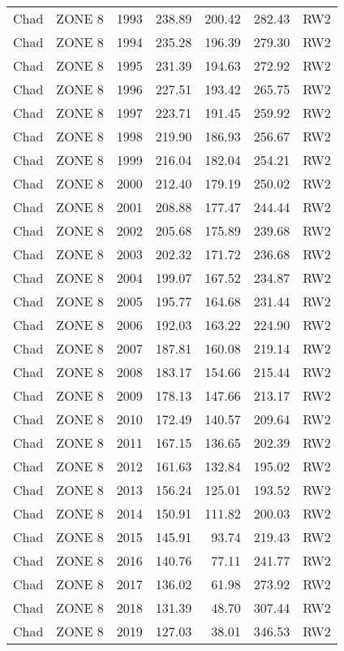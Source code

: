 \begin{longtable}{lllrrrl}
  Chad & ZONE 8 & 1993 & 238.89 & 200.42 & 282.43 & RW2 \\ 
  Chad & ZONE 8 & 1994 & 235.28 & 196.39 & 279.30 & RW2 \\ 
  Chad & ZONE 8 & 1995 & 231.39 & 194.63 & 272.92 & RW2 \\ 
  Chad & ZONE 8 & 1996 & 227.51 & 193.42 & 265.75 & RW2 \\ 
  Chad & ZONE 8 & 1997 & 223.71 & 191.45 & 259.92 & RW2 \\ 
  Chad & ZONE 8 & 1998 & 219.90 & 186.93 & 256.67 & RW2 \\ 
  Chad & ZONE 8 & 1999 & 216.04 & 182.04 & 254.21 & RW2 \\ 
  Chad & ZONE 8 & 2000 & 212.40 & 179.19 & 250.02 & RW2 \\ 
  Chad & ZONE 8 & 2001 & 208.88 & 177.47 & 244.44 & RW2 \\ 
  Chad & ZONE 8 & 2002 & 205.68 & 175.89 & 239.68 & RW2 \\ 
  Chad & ZONE 8 & 2003 & 202.32 & 171.72 & 236.68 & RW2 \\ 
  Chad & ZONE 8 & 2004 & 199.07 & 167.52 & 234.87 & RW2 \\ 
  Chad & ZONE 8 & 2005 & 195.77 & 164.68 & 231.44 & RW2 \\ 
  Chad & ZONE 8 & 2006 & 192.03 & 163.22 & 224.90 & RW2 \\ 
  Chad & ZONE 8 & 2007 & 187.81 & 160.08 & 219.14 & RW2 \\ 
  Chad & ZONE 8 & 2008 & 183.17 & 154.66 & 215.44 & RW2 \\ 
  Chad & ZONE 8 & 2009 & 178.13 & 147.66 & 213.17 & RW2 \\ 
  Chad & ZONE 8 & 2010 & 172.49 & 140.57 & 209.64 & RW2 \\ 
  Chad & ZONE 8 & 2011 & 167.15 & 136.65 & 202.39 & RW2 \\ 
  Chad & ZONE 8 & 2012 & 161.63 & 132.84 & 195.02 & RW2 \\ 
  Chad & ZONE 8 & 2013 & 156.24 & 125.01 & 193.52 & RW2 \\ 
  Chad & ZONE 8 & 2014 & 150.91 & 111.82 & 200.03 & RW2 \\ 
  Chad & ZONE 8 & 2015 & 145.91 & 93.74 & 219.43 & RW2 \\ 
  Chad & ZONE 8 & 2016 & 140.76 & 77.11 & 241.77 & RW2 \\ 
  Chad & ZONE 8 & 2017 & 136.02 & 61.98 & 273.92 & RW2 \\ 
  Chad & ZONE 8 & 2018 & 131.39 & 48.70 & 307.44 & RW2 \\ 
  Chad & ZONE 8 & 2019 & 127.03 & 38.01 & 346.53 & RW2 \\ 

\end{longtable}
